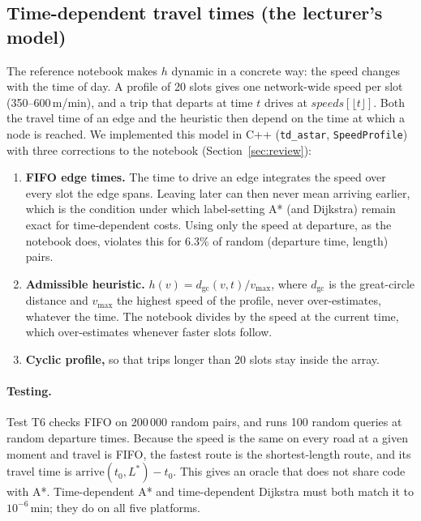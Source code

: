 \subsection{Time-dependent travel times (the lecturer's model)}
\label{sec:seq-td}

The reference notebook makes $h$ dynamic in a concrete way: the speed changes
with the time of day. A profile of 20 slots gives one network-wide speed per
slot (350--600\,m/min), and a trip that departs at time $t$ drives at
$\mathit{speeds}[\lfloor t \rfloor]$. Both the travel time of an edge and the
heuristic then depend on the time at which a node is reached. We implemented
this model in C++ (\texttt{td\_astar}, \texttt{SpeedProfile}) with three
corrections to the notebook (Section~\ref{sec:review}):

\begin{enumerate}[nosep]
  \item \textbf{FIFO edge times.} The time to drive an edge integrates the
        speed over every slot the edge spans. Leaving later can then never
        mean arriving earlier, which is the condition under which
        label-setting A* (and Dijkstra) remain exact for time-dependent costs.
        Using only the speed at departure, as the notebook does, violates this
        for 6.3\% of random (departure time, length) pairs.
  \item \textbf{Admissible heuristic.} $h(v) = d_{\mathrm{gc}}(v,t)/v_{\max}$,
        where $d_{\mathrm{gc}}$ is the great-circle distance and $v_{\max}$ the
        highest speed of the profile, never over-estimates, whatever the time.
        The notebook divides by the speed at the current time, which
        over-estimates whenever faster slots follow.
  \item \textbf{Cyclic profile,} so that trips longer than 20 slots stay
        inside the array.
\end{enumerate}

\paragraph{Testing.} Test T6 checks FIFO on 200\,000 random pairs, and runs
100 random queries at random departure times. Because the speed is the same on
every road at a given moment and travel is FIFO, the fastest route is the
shortest-length route, and its travel time is $\mathrm{arrive}(t_0, L^*) - t_0$.
This gives an oracle that does not share code with A*. Time-dependent A* and
time-dependent Dijkstra must both match it to $10^{-6}$\,min; they do on all
five platforms.

